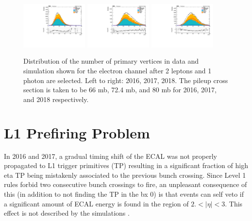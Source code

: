 \begin{figure}[hbtp]
  \begin{center}
     \includegraphics[width=0.3\textwidth]{fig/pileup/ele_kin_nVtx_valid_Legacy16_HLT.pdf}
     \includegraphics[width=0.3\textwidth]{fig/pileup/ele_kin_nVtx_valid_Rereco17_HLT.pdf}
     \includegraphics[width=0.3\textwidth]{fig/pileup/ele_kin_nVtx_valid_Rereco18_HLT.pdf}
  \end{center}
\caption{Distribution of the number of primary vertices in data and simulation shown for the electron channel after 2 leptons and 1 photon are selected. Left to right: 2016, 2017, 2018. The pileup cross section is taken to be 66 mb, 72.4 mb, and 80 mb for 2016, 2017, and 2018 respectively.}
\label{fig:puwei}
\end{figure}

\section{L1 Prefiring Problem}\label{sec:L1}
In 2016 and 2017, a gradual timing shift of the ECAL was not properly propagated to 
L1 trigger primitives (TP) resulting in a significant fraction of high eta TP 
being mistakenly associated to the previous bunch crossing. 
Since Level 1 rules forbid two consecutive bunch crossings to fire, 
an unpleasant consequence of this (in addition to not finding the TP in the bx 0) 
is that events can self veto if a significant amount of ECAL energy is found in the region 
of $2.<|\eta|<3$. This effect is not described by the simulations \cite{L1_prefire}.\\

